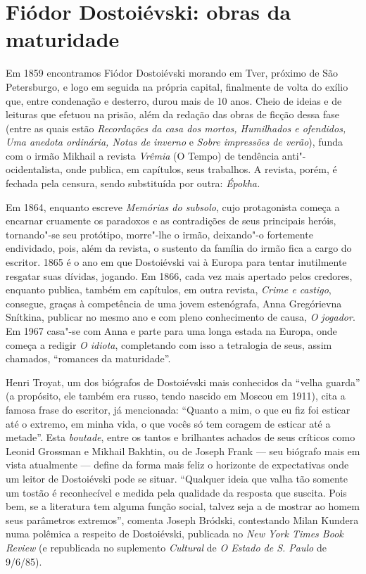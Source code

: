 \section{Fiódor Dostoiévski: obras da maturidade}



Em 1859 encontramos Fiódor Dostoiévski morando em Tver, próximo de São
Petersburgo, e logo em seguida na própria capital, finalmente de volta
do exílio que, entre condenação e desterro, durou mais de 10 anos. Cheio
de ideias e de leituras que efetuou na prisão, além da redação das obras
de ficção dessa fase (entre as quais estão \emph{Recordações da casa dos
mortos, Humilhados e ofendidos, Uma anedota ordinária, Notas de
inverno} e \emph{Sobre impressões de verão}), funda com o irmão Mikhail a
revista \emph{Vrêmia} (O Tempo) de tendência anti"-ocidentalista, onde
publica, em capítulos, seus trabalhos. A revista, porém, é fechada pela
censura, sendo substituída por outra: \emph{Épokha.}

Em 1864, enquanto escreve \emph{Memórias do subsolo}, cujo protagonista
começa a encarnar cruamente os paradoxos e as contradições de seus
principais heróis, tornando"-se seu protótipo, morre"-lhe o irmão,
deixando"-o fortemente endividado, pois, além da revista, o sustento da
família do irmão fica a cargo do escritor. 1865 é o ano em que
Dostoiévski vai à Europa para tentar inutilmente resgatar suas dívidas,
jogando. Em 1866, cada vez mais apertado pelos credores, enquanto
publica, também em capítulos, em outra revista, \emph{Crime e
castigo}, consegue, graças à competência de uma jovem estenógrafa, Anna
Gregórievna Snítkina, publicar no mesmo ano e com pleno conhecimento de
causa, \emph{O jogador}. Em 1967 casa"-se com Anna e parte para uma longa
estada na Europa, onde começa a redigir \emph{O idiota}, completando com
isso a tetralogia de seus, assim chamados, ``romances da maturidade''.

Henri Troyat, um dos biógrafos de Dostoiévski mais conhecidos da 
``velha guarda'' (a propósito, ele também era russo, tendo nascido em
Moscou em 1911), cita a famosa frase do escritor, já mencionada:
``Quanto a mim, o que eu fiz foi esticar
até o extremo, em minha vida, o que vocês só tem coragem de esticar até
a metade''. Esta \emph{boutade}, entre os tantos e brilhantes achados
de seus críticos como Leonid Grossman e Mikhail Bakhtin, ou de Joseph
Frank --- seu biógrafo mais em vista atualmente --- define da forma mais feliz o
horizonte de expectativas onde um leitor de Dostoiévski pode se situar.
``Qualquer ideia que valha tão somente um tostão é reconhecível e medida
pela qualidade da resposta que suscita. Pois bem, se a literatura tem
alguma função social, talvez seja a de mostrar ao homem seus parâmetros
extremos'', comenta Joseph Bródski, contestando Milan Kundera numa
polêmica a respeito de Dostoiévski, publicada no \emph{New York Times
Book Review} (e republicada no suplemento \emph{Cultural} de \emph{O
Estado de S. Paulo} de 9/6/85).



